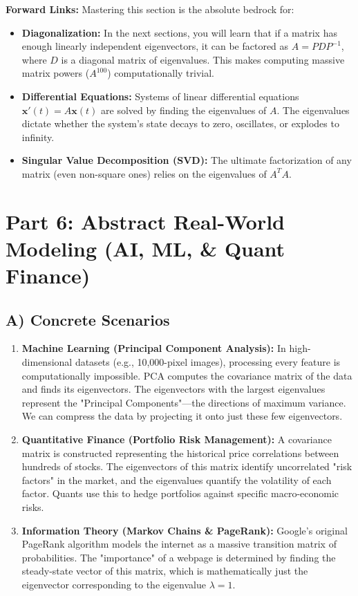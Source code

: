 \documentclass[11pt, a4paper]{article}
\theoremstyle{definition}
\theoremstyle{remark}
\begin{document}
\textbf{Forward Links:} Mastering this section is the absolute bedrock for:
\begin{itemize}
    \item \textbf{Diagonalization:} In the next sections, you will learn that if a matrix has enough linearly independent eigenvectors, it can be factored as $A = PDP^{-1}$, where $D$ is a diagonal matrix of eigenvalues. This makes computing massive matrix powers ($A^{100}$) computationally trivial.
    \item \textbf{Differential Equations:} Systems of linear differential equations $\mathbf{x}'(t) = A\mathbf{x}(t)$ are solved by finding the eigenvalues of $A$. The eigenvalues dictate whether the system's state decays to zero, oscillates, or explodes to infinity.
    \item \textbf{Singular Value Decomposition (SVD):} The ultimate factorization of any matrix (even non-square ones) relies on the eigenvalues of $A^T A$.
\end{itemize}

\section{Part 6: Abstract Real-World Modeling (AI, ML, \& Quant Finance)}

\subsection{A) Concrete Scenarios}
\begin{enumerate}
    \item \textbf{Machine Learning (Principal Component Analysis):} In high-dimensional datasets (e.g., 10,000-pixel images), processing every feature is computationally impossible. PCA computes the covariance matrix of the data and finds its eigenvectors. The eigenvectors with the largest eigenvalues represent the "Principal Components"—the directions of maximum variance. We can compress the data by projecting it onto just these few eigenvectors.
    \item \textbf{Quantitative Finance (Portfolio Risk Management):} A covariance matrix is constructed representing the historical price correlations between hundreds of stocks. The eigenvectors of this matrix identify uncorrelated "risk factors" in the market, and the eigenvalues quantify the volatility of each factor. Quants use this to hedge portfolios against specific macro-economic risks.
    \item \textbf{Information Theory (Markov Chains \& PageRank):} Google's original PageRank algorithm models the internet as a massive transition matrix of probabilities. The "importance" of a webpage is determined by finding the steady-state vector of this matrix, which is mathematically just the eigenvector corresponding to the eigenvalue $\lambda = 1$.
\end{enumerate}
\end{document}

